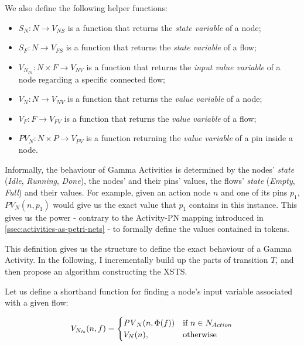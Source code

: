 We also define the following helper functions:

\begin{itemize}
	\item \(S_N : N \rightarrow V_\mathit{NS} \) is a function that returns the \emph{state variable} of a node;
	\item \(S_F : N \rightarrow V_\mathit{FS} \) is a function that returns the \emph{state variable} of a flow;
	\item \(V_{N_\mathit{In}} : N \times F \rightarrow V_\mathit{NV} \) is a function that returns the \emph{input value variable} of a node regarding a specific connected flow;
	\item \(V_N : N \rightarrow V_\mathit{NV} \) is a function that returns the \emph{value variable} of a node;
	\item \(V_F : F \rightarrow V_\mathit{FV} \) is a function that returns the \emph{value variable} of a flow;
	\item \(\mathit{PV}_N : N \times P \rightarrow V_\mathit{PV} \) is a function returning the \emph{value variable} of a pin inside a node.
\end{itemize}

Informally, the behaviour of Gamma Activities is determined by the nodes' \emph{state} (\emph{Idle}, \emph{Running}, \emph{Done}), the nodes' and their pins' values, the flows' \emph{state} (\emph{Empty}, \emph{Full}) and their values. For example, given an action node \(n\) and one of its pins \(p_1\), \(\mathit{PV}_N(n, p_1)\) would give us the exact value that \(p_1\) contains in this instance. This gives us the power - contrary to the Activity-PN mapping introduced in \autoref{ssec:activities-as-petri-nets} - to formally define the values contained in tokens.

This definition gives us the structure to define the exact behaviour of a Gamma Activity. In the following, I incrementally build up the parts of transition \(T\), and then propose an algorithm constructing the XSTS. 

Let us define a shorthand function for finding a node's input variable associated with a given flow:

\begin{equation*}
	V_{N_\mathit{In}}(n, f) = 
	\begin{cases}
		\mathit{PV}_N(n, \Phi(f)) & \text{if } n \in N_{Action} \\
		V_N(n), & \text{otherwise}
	\end{cases}
\end{equation*}


